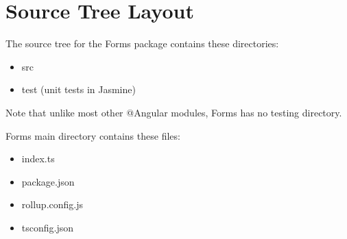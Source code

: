 \section{Source Tree Layout}

The source tree for the Forms package contains these directories:

\begin{itemize}
  \item src
  \item test (unit tests in Jasmine)
\end{itemize}

Note that unlike most other @Angular modules, Forms has no testing directory.

Forms main directory contains these files:

\begin{itemize}
  \item index.ts
  \item package.json
  \item rollup.config.js
  \item tsconfig.json
\end{itemize}
